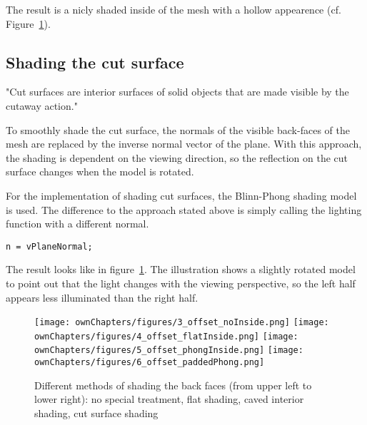 The result is a nicly shaded inside of the mesh with a hollow appearence (cf. Figure~\ref{fig:shading}).

\subsection{Shading the cut surface}
\label{chap:cutSurface}
"Cut surfaces are interior surfaces of solid objects that are made visible by the cutaway action."~\cite{jour:adaptiveCutaways}

To smoothly shade the cut surface, the normals of the visible back-faces of the mesh are replaced by the inverse normal vector of the plane. With this approach, the shading is dependent on the viewing direction, so the reflection on the cut surface changes when the model is rotated.

For the implementation of shading cut surfaces, the Blinn-Phong shading model is used. The difference to the approach stated above is simply calling the lighting function with a different normal.
\begin{lstlisting}
n = vPlaneNormal;
\end{lstlisting}

The result looks like in figure~\ref{fig:shading}. The illustration shows a slightly rotated model to point out that the light changes with the viewing perspective, so the left half appears less illuminated than the right half.

\begin{figure}%
\centering
\texttt{[image: ownChapters/figures/3\_offset\_noInside.png]}%
\hspace{7.00mm}
\texttt{[image: ownChapters/figures/4\_offset\_flatInside.png]}%
\hspace{7.00mm}
\texttt{[image: ownChapters/figures/5\_offset\_phongInside.png]}%
\hspace{7.00mm}
\texttt{[image: ownChapters/figures/6\_offset\_paddedPhong.png]}%
\caption{Different methods of shading the back faces (from upper left to lower right): no special treatment, flat shading, caved interior shading, cut surface shading}%
\label{fig:shading}%
\end{figure}